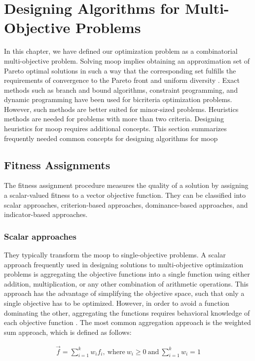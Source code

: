 \section{Designing Algorithms for Multi-Objective Problems}
In this chapter, we have defined our optimization problem as a combinatorial multi-objective problem. Solving \gls{moop} implies obtaining an approximation set of Pareto optimal solutions in such a way that the corresponding set fulfills the requirements of convergence to the Pareto front and
uniform diversity \parencite{Talbi2009Metaheuristics:Implementation}. Exact methods such as branch and bound algorithms, constraint programming, and dynamic programming have been used for bicriteria optimization problems. However, such methods are better suited for minor-sized problems. Heuristics methods are needed for problems with more than two criteria. Designing heuristics for \gls{moop} requires additional concepts. This section summarizes frequently needed common concepts for designing algorithms for \gls{moop}


\subsection{Fitness Assignments}
The fitness assignment procedure measures the quality of a solution by assigning a scalar-valued fitness to a vector objective function. They can be classified into scalar approaches, criterion-based approaches, dominance-based approaches, and indicator-based approaches.

\subsubsection{Scalar approaches}
They typically transform the \gls{moop} to single-objective problems. A scalar approach frequently used in designing solutions to multi-objective optimization problems is aggregating the objective functions into a single function using either addition, multiplication, or any other combination of arithmetic operations. This approach has the advantage of simplifying the objective space, such that only a single objective has to be optimized. However, in order to avoid a function dominating the other, aggregating the functions requires behavioral knowledge of each objective function \parencite{CoelloCoello1999ATechniquesc}. The most common aggregation approach is the weighted sum approach, which is defined as follows:

\begin{gather*}
   \Vec{f} = \sum_{i=1}^k w_i f_i, \ \text{where}\ w_i \geq 0\ \text{and}\ \sum_{i=1}^k w_i = 1
\end{gather*}

